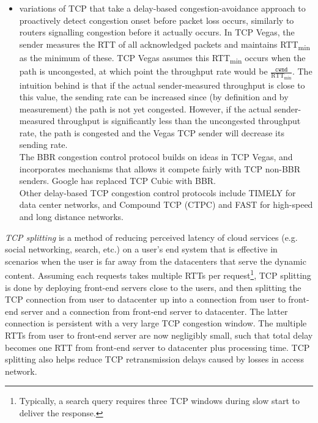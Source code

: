 \documentclass[table, xcdraw]{article}%
\begin{document}
\begin{itemize}
\begin{itemize}
        \item variations of TCP that take a delay-based congestion-avoidance approach to proactively detect congestion onset before packet loss occurs, similarly to routers signalling congestion before it actually occurs. In TCP Vegas, the sender measures the RTT of all acknowledged packets and maintains RTT\textsubscript{min} as the minimum of these. TCP Vegas assumes this RTT\textsubscript{min} occurs when the path is uncongested, at which point the throughput rate would be $\frac{\mathtt{cwnd}}{\text{RTT}_\text{min}}$. The intuition behind is that if the actual sender-measured throughput is close to this value, the sending rate can be increased since (by definition and by measurement) the path is not yet congested. However, if the actual sender-measured throughput is significantly less than the uncongested throughput rate, the path is congested and the Vegas TCP sender will decrease its sending rate.\\
        The BBR congestion control protocol builds on ideas in TCP Vegas, and incorporates mechanisms that allows it compete fairly with TCP non-BBR senders. Google has replaced TCP Cubic with BBR.\\
        Other delay-based TCP congestion control protocols include TIMELY for data center networks, and Compound TCP (CTPC) and FAST for high-speed and long distance networks.
    \end{itemize}
\end{itemize}



\emph{TCP splitting} is a method of reducing perceived latency of cloud services (e.g. social networking, search, etc.) on a user's end system that is effective in scenarios when the user is far away from the datacenters that serve the dynamic content. Assuming each requests takes multiple RTTs per request\footnote{Typically, a search query requires three TCP windows during slow start to deliver the response.}, TCP splitting is done by deploying front-end servers close to the users, and then splitting the TCP connection from user to datacenter up into a connection from user to front-end server and a connection from front-end server to datacenter. The latter connection is persistent with a very large TCP congestion window. The multiple RTTs from user to front-end server are now negligibly small, such that total delay becomes one RTT from front-end server to datacenter plus processing time. TCP splitting also helps reduce TCP retransmission delays caused by losses in access network.
\end{document}
